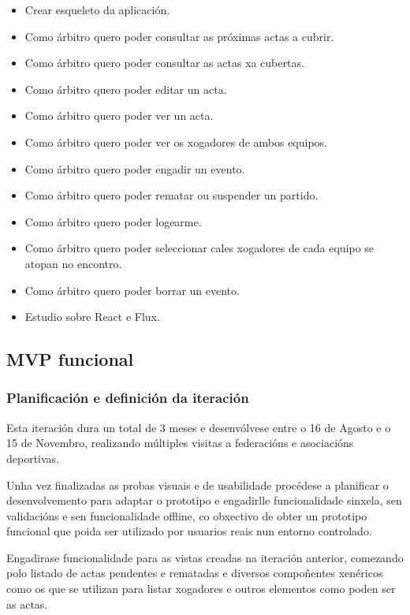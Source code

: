       \begin{itemize}
        \item Crear esqueleto da aplicación.
        \item Como árbitro quero poder consultar as próximas actas a 
cubrir.
        \item Como árbitro quero poder consultar as actas xa cubertas.
        \item Como árbitro quero poder editar un acta.
        \item Como árbitro quero poder ver un acta.
        \item Como árbitro quero poder ver os xogadores de ambos equipos.
        \item Como árbitro quero poder engadir un evento.
        \item Como árbitro quero poder rematar ou suspender un partido.
        \item Como árbitro quero poder logearme.
        \item Como árbitro quero poder seleccionar cales xogadores de cada 
equipo se atopan no encontro.
        \item Como árbitro quero poder borrar un evento.
        \item Estudio sobre React e Flux.
       \end{itemize}

    \subsection{MVP funcional}

      \subsubsection{Planificación e definición da iteración}
      Esta iteración dura un total de 3 meses e desenvólvese entre o 16 de 
Agosto e o 15 de Novembro, realizando múltiples visitas a federacións e 
asociacións deportivas.

      Unha vez finalizadas as probas visuais e de usabilidade procédese 
a planificar o desenvolvemento para adaptar o prototipo e engadirlle 
funcionalidade sinxela, sen validacións e sen funcionalidade offline, co 
obxectivo de obter un prototipo funcional que poida ser utilizado por usuarios 
reais nun entorno controlado.

      Engadirase funcionalidade para as vistas creadas na iteración anterior, 
comezando polo listado de actas pendentes e rematadas e diversos compoñentes 
xenéricos como os que se utilizan para listar xogadores e outros elementos como 
poden ser as actas.

